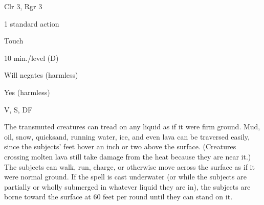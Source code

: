 
\begin{description*}
\item[Level:] Clr 3, Rgr 3
\item[Casting Time:] 1 standard action
\item[Range:] Touch
\item[Duration:] 10 min./level (D)
\item[Saving Throw:] Will negates (harmless)
\item[Spell Resistance:] Yes (harmless)
\item[Components:] V, S, DF
\end{description*}

The transmuted creatures can tread on any liquid as if it were firm ground. Mud,
oil, snow, quicksand, running water, ice, and even lava can be traversed easily,
since the subjects' feet hover an inch or two above the surface. (Creatures crossing
molten lava still take damage from the heat because they are near it.) The subjects
can walk, run, charge, or otherwise move across the surface as if it were normal
ground.
If the spell is cast underwater (or while the subjects are partially or wholly
submerged in whatever liquid they are in), the subjects are borne toward the surface
at 60 feet per round until they can stand on it.